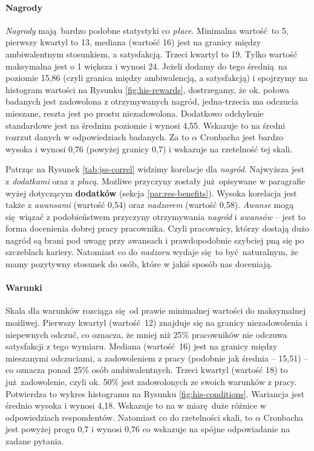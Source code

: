 \paragraph{Nagrody} \textit{Nagrody} mają bardzo podobne statystyki co \textit{płace}. Minimalna wartość to 5, pierwszy kwartyl to 13, mediana (wartość 16) jest na granicy między ambiwalentnym stosunkiem, a satysfakcją. Trzeci kwartyl to 19. Tylko wartość maksymalna jest o 1 większa i wynosi 24. Jeżeli dodamy do tego średnią na poziomie 15,86 (czyli granica między ambiwalencją, a satysfakcją) i spojrzymy na histogram wartości na Rysunku \ref{fig:his-rewards},
dostrzegamy, że ok. połowa badanych jest zadowolona z otrzymywanych nagród, jedna-trzecia ma odczucia mieszane, reszta jest po prostu niezadowolona. Dodatkowo odchylenie standardowe jest na średnim poziomie i wynosi 4,55. Wskazuje to na średni rozrzut danych w odpowiedziach badanych. Za to $\alpha$ Cronbacha jest bardzo wysoka i wynosi 0,76 (powyżej granicy 0,7) i wskazuje na rzetelność tej skali.

Patrząc na Rysunek \ref{tab:jss-correl} widzimy korelacje dla \textit{nagród}. Najwyższa jest z \textit{dodatkami} oraz z \textit{płacą}. Możliwe przyczyny zostały już opisywane w paragrafie wyżej dotyczącym \textbf{dodatków} (sekcja \ref{par:res-benefits}). Wysoka korelacja jest także z \textit{awansami} (wartość 0,54) oraz \textit{nadzorem} (wartość 0,58). \textit{Awanse} mogą się wiązać z podobieństwem przyczyny otrzymywania \textit{nagród} i \textit{awansów} -- jest to forma
docenienia dobrej pracy pracownika. Czyli pracownicy, którzy dostają dużo nagród są brani pod uwagę przy awansach i prawdopodobnie szybciej pną się po szczeblach kariery. Natomiast co do \textit{nadzoru} wydaje się to być naturalnym, że mamy pozytywny stosunek do osób, które w jakiś sposób nas doceniają.

\paragraph{Warunki} Skala dla warunków rozciąga się od prawie minimalnej wartości do maksymalnej możliwej. Pierwszy kwartyl (wartość 12) znajduje się na granicy niezadowolenia i niepewnych odczuć, co oznacza, że mniej niż 25\% pracowników nie odczuwa satysfakcji z tego wymiaru. Mediana (wartość 16) jest na granicy między mieszanymi odczuciami, a zadowoleniem z pracy (podobnie jak średnia -- 15,51) -- co oznacza ponad 25\% osób ambiwalentnych. Trzeci kwartyl (wartość 18) to już zadowolenie, czyli ok. 50\% jest zadowolonych ze swoich
warunków z pracy. Potwierdza to wykres histogramu na Rysunku \ref{fig:his-conditions}. Wariancja jest średnio wysoka i wynosi 4,18. Wskazuje to na w miarę duże różnice w odpowiedziach respondentów. Natomiast co do rzetelności skali, to $\alpha$ Cronbacha jest powyżej progu 0,7 i wynosi 0,76 co wskazuje na spójne odpowiadanie na zadane pytania.

